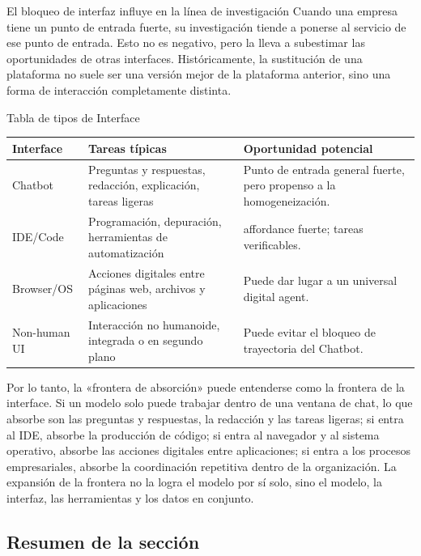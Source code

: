 \documentclass[a4paper]{article}
\begin{document}
\begin{warningbox}{El bloqueo de interfaz influye en la línea de investigación}
Cuando una empresa tiene un punto de entrada fuerte, su investigación tiende a ponerse al servicio de ese punto de entrada. Esto no es negativo, pero la lleva a subestimar las oportunidades de otras interfaces. Históricamente, la sustitución de una plataforma no suele ser una versión mejor de la plataforma anterior, sino una forma de interacción completamente distinta.
\end{warningbox}

\begin{knowledgebox}{Tabla de tipos de Interface}
\begin{tabularx}{\textwidth}{p{}p{}X}
\toprule
Interface & Tareas típicas & Oportunidad potencial \\
\midrule
Chatbot & Preguntas y respuestas, redacción, explicación, tareas ligeras & Punto de entrada general fuerte, pero propenso a la homogeneización. \\
IDE/Code & Programación, depuración, herramientas de automatización & affordance fuerte; tareas verificables. \\
Browser/OS & Acciones digitales entre páginas web, archivos y aplicaciones & Puede dar lugar a un universal digital agent. \\
Non-human UI & Interacción no humanoide, integrada o en segundo plano & Puede evitar el bloqueo de trayectoria del Chatbot. \\
\bottomrule
\end{tabularx}
\end{knowledgebox}

Por lo tanto, la «frontera de absorción» puede entenderse como la frontera de la interface. Si un modelo solo puede trabajar dentro de una ventana de chat, lo que absorbe son las preguntas y respuestas, la redacción y las tareas ligeras; si entra al IDE, absorbe la producción de código; si entra al navegador y al sistema operativo, absorbe las acciones digitales entre aplicaciones; si entra a los procesos empresariales, absorbe la coordinación repetitiva dentro de la organización. La expansión de la frontera no la logra el modelo por sí solo, sino el modelo, la interfaz, las herramientas y los datos en conjunto.

\subsection{Resumen de la sección}
\end{document}

